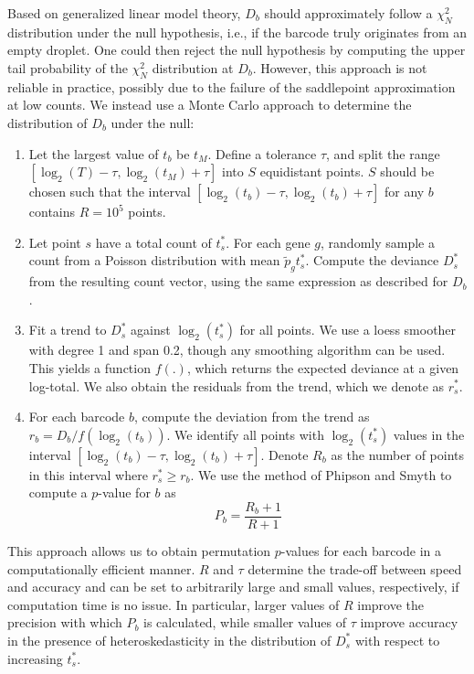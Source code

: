 \documentclass[10pt,letterpaper]{article}
\begin{document}
Based on generalized linear model theory, $D_b$ should approximately follow a $\chi^2_N$ distribution under the null hypothesis, i.e., if the barcode truly originates from an empty droplet.
One could then reject the null hypothesis by computing the upper tail probability of the $\chi^2_N$ distribution at $D_b$.
However, this approach is not reliable in practice, possibly due to the failure of the saddlepoint approximation at low counts.
We instead use a Monte Carlo approach to determine the distribution of $D_b$ under the null:
\begin{enumerate}
    \item Let the largest value of $t_b$ be $t_M$.
        Define a tolerance $\tau$, and split the range $[\log_2(T)-\tau, \log_2(t_M)+\tau]$ into $S$ equidistant points.
        $S$ should be chosen such that the interval $[\log_2(t_b) - \tau, \log_2(t_b)+\tau]$ for any $b$ contains $R=10^5$ points.
    \item Let point $s$ have a total count of $t^*_s$. 
        For each gene $g$, randomly sample a count from a Poisson distribution with mean $\tilde{p}_g t^*_s$.
        Compute the deviance $D^*_s$ from the resulting count vector, using the same expression as described for $D_b$.
    \item Fit a trend to $D^*_s$ against $\log_2(t^*_s)$ for all points.
        We use a loess smoother with degree 1 and span 0.2, though any smoothing algorithm can be used.
        This yields a function $f(.)$, which returns the expected deviance at a given log-total.
        We also obtain the residuals from the trend, which we denote as $r^*_s$.
    \item For each barcode $b$, compute the deviation from the trend as $r_{b} = D_b/f(\log_2(t_b))$.
        We identify all points with $\log_2(t^*_s)$ values in the interval $[\log_2(t_b) - \tau, \log_2(t_b)+\tau]$.
        Denote $R_{b}$ as the number of points in this interval where $r^*_s \ge r_{b}$.
        We use the method of Phipson and Smyth \cite{phipson2010permutation} to compute a $p$-value for $b$ as
        \[
            P_b = \frac{R_b + 1}{R + 1}
        \]
\end{enumerate}
This approach allows us to obtain permutation $p$-values for each barcode in a computationally efficient manner.
$R$ and $\tau$ determine the trade-off between speed and accuracy and can be set to arbitrarily large and small values, respectively, if computation time is no issue. 
In particular, larger values of $R$ improve the precision with which $P_b$ is calculated, while smaller values of $\tau$ improve accuracy in the presence of heteroskedasticity in the distribution of $D^*_s$ with respect to increasing $t^*_s$.
\end{document}
